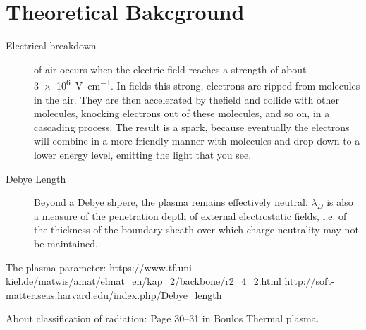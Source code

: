 ﻿\documentclass[openany]{book}
\begin{document}
\chapter{Theoretical Bakcground}
\begin{description}
\item[Electrical  breakdown] of air occurs when the electric field reaches a strength of about \SI{3e6}{\volt\per\cm}. In fields this strong, electrons are ripped from molecules in the air. They are then accelerated by thefield and collide with other molecules, knocking electrons out of these molecules,  and  so  on,  in  a  cascading  process.  The  result  is  a spark, because eventually the electrons will combine in a more friendly manner with molecules and drop down to a lower energy level, emitting the light that you see.
\item[Debye Length] Beyond a Debye shpere, the plasma remains effectively neutral. $\lambda_D$ is also a measure of the penetration depth of external electrostatic fields, i.e. of the thickness of the boundary sheath over which charge neutrality may not be maintained.
\end{description}

The plasma parameter:
https://www.tf.uni-kiel.de/matwis/amat/elmat_en/kap_2/backbone/r2_4_2.html
http://soft-matter.seas.harvard.edu/index.php/Debye_length

About classification of radiation:
Page 30--31 in Boulos Thermal plasma.
\end{document}
